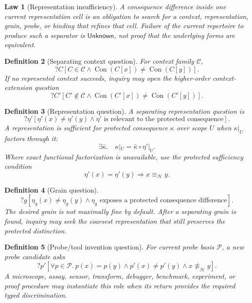 \documentclass[11pt,oneside]{article}
\newtheorem{definition}{Definition}[section]
\newtheorem{law}[definition]{Law}
\newcommand{\Con}{\operatorname{Con}}
\begin{document}
\begin{law}[Representation insufficiency]
A consequence difference inside one current representation cell is an obligation to search for a context, representation, grain, probe, or binding that refines that cell.  Failure of the current repertoire to produce such a separator is \(\mathsf{Unknown}\), not proof that the underlying forms are equivalent.
\end{law}

\begin{definition}[Separating context question]
For context family \(\mathcal C\),
\[
\boxed{
?C[
C\in\mathcal C
\land
\Con(C[x])\neq\Con(C[y])
].
}
\]
If no represented context succeeds, inquiry may open the higher-order context-extension question
\[
?C'[
C'\notin\mathcal C
\land
\Con(C'[x])\neq\Con(C'[y])
].
\]
\end{definition}

\begin{definition}[Representation question]
A separating representation question is
\[
\boxed{
?\eta'[
\eta'(x)\neq\eta'(y)
\land
\eta'\text{ is relevant to the protected consequence}
].
}
\]
A representation is sufficient for protected consequence \(\kappa\) over scope \(U\) when \(\kappa|_U\) factors through it:
\[
\boxed{
\exists \bar\kappa.\quad
\kappa|_U=\bar\kappa\circ\eta'|_U.
}
\]
Where exact functional factorization is unavailable, use the protected sufficiency condition
\[
\eta'(x)=\eta'(y)\Longrightarrow x\equiv_{\mathcal H}y.
\]
\end{definition}

\begin{definition}[Grain question]
\[
\boxed{
?g[
\eta_g(x)\neq\eta_g(y)
\land
\eta_g\text{ exposes a protected consequence difference}
].
}
\]
The desired grain is not maximally fine by default.  After a separating grain is found, inquiry may seek the coarsest representation that still preserves the protected distinction.
\end{definition}

\begin{definition}[Probe/tool invention question]
For current probe basis \(\mathcal P\), a new probe candidate asks
\[
\boxed{
?p'[
\forall p\in\mathcal P.\ p(x)=p(y)
\land
p'(x)\neq p'(y)
\land
x\not\equiv_{\mathcal H}y
].
}
\]
A microscope, assay, sensor, transform, debugger, benchmark, experiment, or proof procedure may instantiate this role when its return provides the required typed discrimination.
\end{definition}
\end{document}
